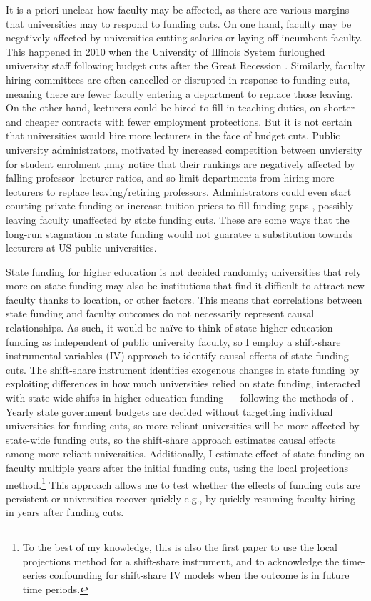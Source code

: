 It is a priori unclear how faculty may be affected, as there are various margins that universities may to respond to funding cuts.
On one hand, faculty may be negatively affected by universities cutting salaries or laying-off incumbent faculty.
This happened in 2010 when the University of Illinois System furloughed university staff following budget cuts after the Great Recession \citep{furlough2010}.
Similarly, faculty hiring committees are often cancelled or disrupted in response to funding cuts, meaning there are fewer faculty entering a department to replace those leaving.
On the other hand, lecturers could be hired to fill in teaching duties, on shorter and cheaper contracts with fewer employment protections.
But it is not certain that universities would hire more lecturers in the face of budget cuts.
Public university administrators, motivated by increased competition between unviersity for student enrolment \citep{hoxby2009changing,urquiola2020markets},may notice that their rankings are negatively affected by falling professor--lecturer ratios, and so limit departments from hiring more lecturers to replace leaving/retiring professors.
Administrators could even start courting private funding or increase tuition prices to fill funding gaps \citep{bound2019public}, possibly leaving faculty unaffected by state funding cuts.
These are some ways that the long-run stagnation in state funding would not guaratee a substitution towards lecturers at US public universities.

State funding for higher education is not decided randomly;
universities that rely more on state funding may also be institutions that find it difficult to attract new faculty thanks to location, or other factors.
This means that correlations between state funding and faculty outcomes do not necessarily represent causal relationships.
As such, it would be na\"ive to think of state higher education funding as independent of public university faculty, so I employ a shift-share instrumental variables (IV) approach to identify causal effects of state funding cuts.
The shift-share instrument identifies exogenous changes in state funding by exploiting differences in how much universities relied on state funding, interacted with state-wide shifts in higher education funding --- following the methods of \cite{NBERw23736,NBERw27885}.
Yearly state government budgets are decided without targetting individual universities for funding cuts, so more reliant universities will be more affected by state-wide funding cuts, so the shift-share approach estimates causal effects among more reliant universities.
Additionally, I estimate effect of state funding on faculty multiple years after the initial funding cuts, using the local projections method.\footnote{
    To the best of my knowledge, this is also the first paper to use the local projections method for a shift-share instrument, and to acknowledge the time-series confounding for shift-share IV models when the outcome is in future time periods.
}
This approach allows me to test whether the effects of funding cuts are persistent or universities recover quickly e.g., by quickly resuming faculty hiring in years after funding cuts.

